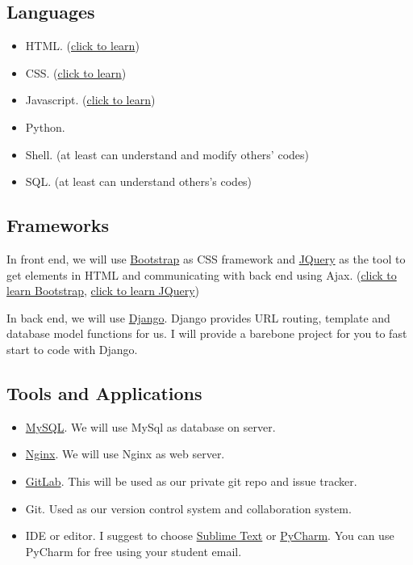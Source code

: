 \documentclass[12pt,a4paper]{article}
\begin{document}
\subsection{Languages}
\begin{itemize}
	\item HTML. (\href{http://www.w3schools.com/html/default.asp}{click to learn})
	\item CSS. (\href{http://www.w3schools.com/css/default.asp}{click to learn})
	\item Javascript. (\href{http://www.w3schools.com/js/default.asp}{click to learn})
	\item Python.
	\item Shell. (at least can understand and modify others' codes)
	\item SQL. (at least can understand others's codes)
\end{itemize}

\subsection{Frameworks}

In front end, we will use \href{http://getbootstrap.com/}{Bootstrap} as CSS framework and \href{https://jquery.com/}{JQuery} as the tool to get elements in HTML and communicating with back end using Ajax. (\href{http://getbootstrap.com/getting-started/}{click to learn Bootstrap}, \href{http://www.w3schools.com/jquery/default.asp}{click to learn JQuery})

In back end, we will use \href{https://www.djangoproject.com/}{Django}. Django provides URL routing, template and database model functions for us. I will provide a barebone project for you to fast start to code with Django.

\subsection{Tools and Applications}

\begin{itemize}
	\item \href{https://www.mysql.com/}{MySQL}. We will use MySql as database on server.
	\item \href{https://www.nginx.com/}{Nginx}. We will use Nginx as web server.
	\item \href{https://about.gitlab.com/}{GitLab}. This will be used as our private git repo and issue tracker.
	\item Git. Used as our version control system and collaboration system.
	\item IDE or editor. I suggest to choose \href{https://www.sublimetext.com/}{Sublime Text} or \href{https://www.jetbrains.com/pycharm/}{PyCharm}. You can use PyCharm for free using your student email.
\end{itemize}
\end{document}
